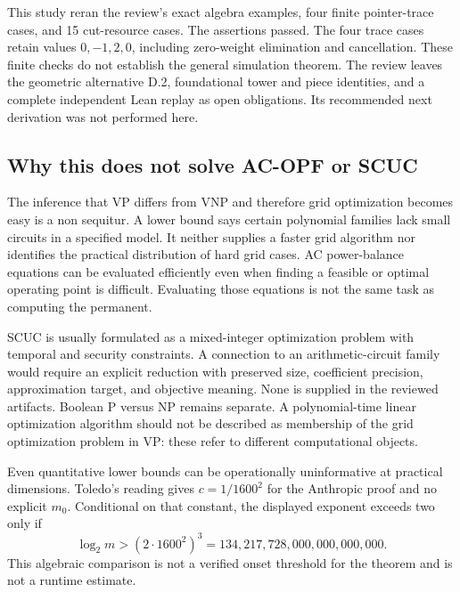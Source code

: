 \documentclass[11pt,letterpaper]{article}
\begin{document}
This study reran the review's exact algebra examples, four finite pointer-trace cases, and 15 cut-resource cases. The assertions passed. The four trace cases retain values $0,-1,2,0$, including zero-weight elimination and cancellation. These finite checks do not establish the general simulation theorem. The review leaves the geometric alternative D.2, foundational tower and piece identities, and a complete independent Lean replay as open obligations. Its recommended next derivation was not performed here.\cite{internalvp}

\subsection{Why this does not solve AC-OPF or SCUC}
The inference that VP differs from VNP and therefore grid optimization becomes easy is a non sequitur. A lower bound says certain polynomial families lack small circuits in a specified model. It neither supplies a faster grid algorithm nor identifies the practical distribution of hard grid cases. AC power-balance equations can be evaluated efficiently even when finding a feasible or optimal operating point is difficult. Evaluating those equations is not the same task as computing the permanent.

SCUC is usually formulated as a mixed-integer optimization problem with temporal and security constraints. A connection to an arithmetic-circuit family would require an explicit reduction with preserved size, coefficient precision, approximation target, and objective meaning. None is supplied in the reviewed artifacts. Boolean P versus NP remains separate. A polynomial-time linear optimization algorithm should not be described as membership of the grid optimization problem in VP: these refer to different computational objects.

Even quantitative lower bounds can be operationally uninformative at practical dimensions. Toledo's reading gives $c=1/1600^2$ for the Anthropic proof and no explicit $m_0$.\cite{toledo} Conditional on that constant, the displayed exponent exceeds two only if
\[
 \log_2m>(2\cdot1600^2)^3
   =134{,}217{,}728{,}000{,}000{,}000{,}000.
\]
This algebraic comparison is not a verified onset threshold for the theorem and is not a runtime estimate.
\end{document}
